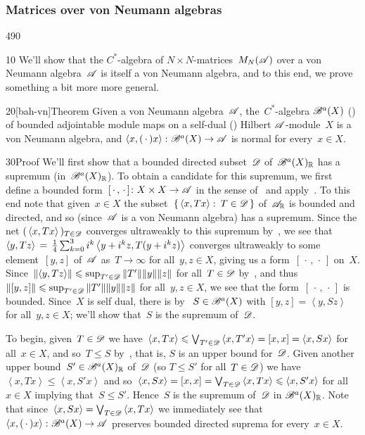 \subsubsection{Matrices over von Neumann algebras} 
\begin{parsec}{490}%
\begin{point}{10}%
We'll show that the $C^*$-algebra
of $N\times N$-matrices~$M_N(\mathscr{A})$
over a von Neumann algebra~$\mathscr{A}$
is itself a von Neumann algebra,
and to this end,
we prove something a bit more more general.
\end{point}
\begin{point}{20}[bah-vn]{Theorem}%
Given a von Neumann algebra~$\mathscr{A}$,
the~$C^*$-algebra $\mathscr{B}^a(X)$ ()%
of bounded adjointable module maps on
a self-dual () Hilbert $\mathscr{A}$-module~$X$
is a  von Neumann algebra,
and
$\left<x,(\,\cdot\,)x\right>\colon \mathscr{B}^a(X)\to\mathscr{A}$
is normal for every~$x\in X$.%
\begin{point}{30}{Proof}%
We'll first show that
a  bounded directed subset~$\mathscr{D}$ of~$\mathscr{B}^a(X)_{\mathbb{R}}$
has a supremum (in~$\mathscr{B}^a(X)_{\mathbb{R}}$).
To obtain a candidate for this supremum,
we first define
a bounded form~$[\,\cdot\,,\,\cdot\,]\colon X\times X\to\mathscr{A}$
in the sense of~
and apply~.
To this end note that given~$x\in X$
the subset~$\{\,\left<x,Tx\right>\colon \, T\in\mathscr{D}\,\}$
of~$\mathscr{A}_{\mathbb{R}}$
is bounded and directed,
and so 
(since~$\mathscr{A}$ is a von Neumann algebra)
has a supremum.
Since the 
net $(\,\left<x,Tx\right>\,)_{T\in \mathscr{D}}$
converges ultraweakly to this supremum
by~,
we see that
$\left<y,Tz\right>\,= \,\frac{1}{4}
\sum_{k=0}^3
i^k\left<y+i^kz,\smash{T(y+i^kz)}\right>$
converges ultraweakly to 
some element~$[y,z]$ of~$\mathscr{A}$
as~$T\to\infty$ for all~$y,z\in X$,
giving us a form~$[\,\cdot\,,\,\cdot\,]$ on~$X$.
Since~$\left\|\left<y,T z \right>\right\|
\leqslant \sup_{T'\in \mathscr{D}} \|T'\| \|y\|\|z\|$
for all~$T\in\mathscr{D}$
by~,
and thus~$\|[y,z]\|\leqslant \sup_{T'\in\mathscr{D}} \|T'\|\|y\|\|z\|$
for all~$y,z\in X$,
we see that the form~$[\,\cdot\,,\,\cdot\,]$
is bounded.
Since~$X$ is self dual,
there is
by~
$S\in \mathscr{B}^a(X)$
with
$[y,z]=\left<y,Sz\right>$
for all~$y,z\in X$;
we'll show that~$S$ is the supremum of~$\mathscr{D}$.

To begin,
given~$T\in\mathscr{D}$
we have~$\left<x,Tx\right>\leqslant\bigvee_{T'\in\mathscr{D}} \left<x,T'x\right>
=[x,x]=\left<x,Sx\right>$
for all~$x\in X$,
and so~$T\leq S$
by~,
that is, $S$ is an upper bound for~$\mathscr{D}$.
Given another upper bound~$S'\in\mathscr{B}^a(X)_{\mathbb{R}}$
of~$\mathscr{D}$
(so  $T\leq S'$ for all~$T\in\mathscr{D}$)
we have~$\left<x,Tx\right>\leq \left<x,S'x\right>$
and so~$\left<x,Sx\right>
=[x,x]=\bigvee_{T\in \mathscr{D}}\left<x,Tx\right>\leqslant \left<x,S'x\right>$
for all~$x\in X$
implying that~$S\leq S'$.
Hence~$S$ is the supremum of~$\mathscr{D}$
in $\mathscr{B}^a(X)_{\mathbb{R}}$.
Note that since~$\left<x,Sx\right>=\bigvee_{T\in\mathscr{D}} \left<x,Tx\right>$
we immediately see
that $\left<x,(\,\cdot\,)x\right>\colon \mathscr{B}^a(X)\to\mathscr{A}$
preserves bounded directed suprema
for every~$x\in X$.


\end{point}
\end{point}
\end{parsec}
